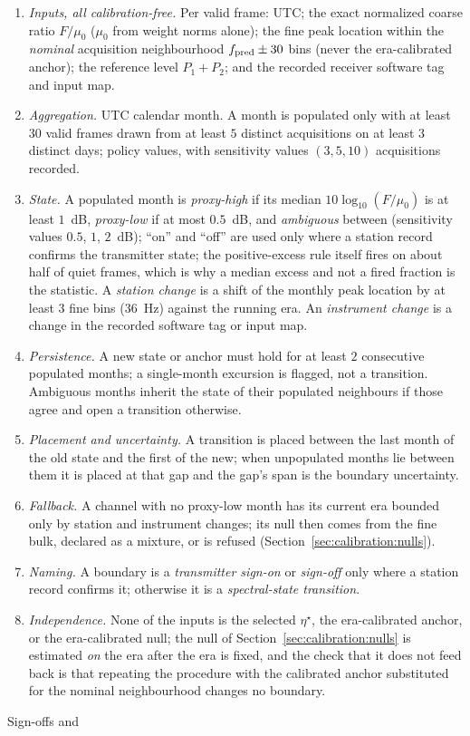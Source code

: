 \begin{enumerate}[leftmargin=2em,itemsep=1pt]
\item \emph{Inputs, all calibration-free.} Per valid frame: UTC; the exact
normalized coarse ratio $F/\mu_0$ ($\mu_0$ from weight norms alone); the fine
peak location within the \emph{nominal} acquisition neighbourhood
$f_{\rm pred} \pm 30$ bins (never the era-calibrated anchor); the reference
level $P_1 + P_2$; and the recorded receiver software tag and input map.
\item \emph{Aggregation.} UTC calendar month.  A month is populated only with at
least $30$ valid frames drawn from at least $5$ distinct acquisitions on at
least $3$ distinct days; policy values, with sensitivity values $(3, 5, 10)$
acquisitions recorded.
\item \emph{State.} A populated month is \emph{proxy-high} if its median
$10\log_{10}(F/\mu_0)$ is at least $1$~dB, \emph{proxy-low} if at most $0.5$~dB, and
\emph{ambiguous} between (sensitivity values $0.5$, $1$, $2$~dB); ``on'' and
``off'' are used only where a station record confirms the transmitter state; the
positive-excess rule itself fires on about half of quiet frames, which is why a
median excess and not a fired fraction is the statistic.  A \emph{station
change} is a shift of the monthly peak location by at least $3$ fine bins
($36$~Hz) against the running era.  An \emph{instrument change} is a change in
the recorded software tag or input map.
\item \emph{Persistence.} A new state or anchor must hold for at least $2$
consecutive populated months; a single-month excursion is flagged, not a
transition.  Ambiguous months inherit the state of their populated neighbours
if those agree and open a transition otherwise.
\item \emph{Placement and uncertainty.} A transition is placed between the last
month of the old state and the first of the new; when unpopulated months lie
between them it is placed at that gap and the gap's span is the boundary
uncertainty.
\item \emph{Fallback.} A channel with no proxy-low month has its current era bounded
only by station and instrument changes; its null then comes from the fine
bulk, declared as a mixture, or is refused (Section~\ref{sec:calibration:nulls}).
\item \emph{Naming.} A boundary is a \emph{transmitter sign-on} or
\emph{sign-off} only where a station record confirms it; otherwise it is a
\emph{spectral-state transition}.
\item \emph{Independence.} None of the inputs is the selected $\eta^\star$, the
era-calibrated anchor, or the era-calibrated null; the null of
Section~\ref{sec:calibration:nulls} is estimated \emph{on} the era after the
era is fixed, and the check that it does not feed back is that repeating the
procedure with the calibrated anchor substituted for the nominal neighbourhood
changes no boundary.
\end{enumerate}  Sign-offs and
